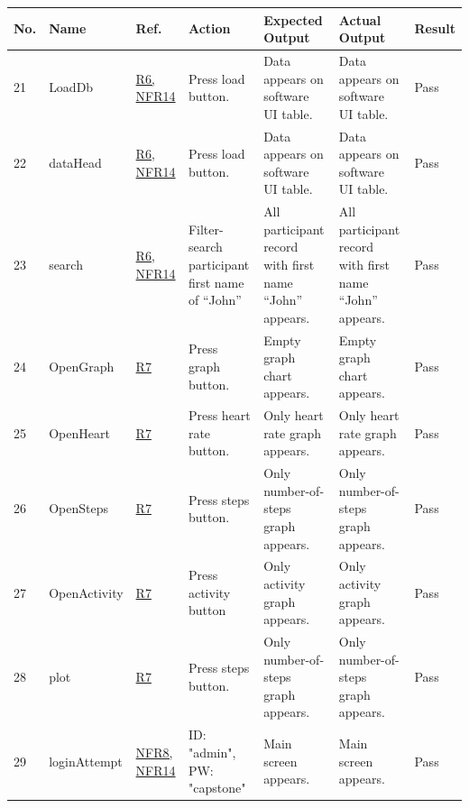 \documentclass[12pt, titlepage]{article}
\begin{document}
\begin{center}
\begin{table} [H]
\begin{tabular}{ | p{0.5cm} | p{2.8cm} |  p{1.1cm} | p{2.7cm} | p{2.7cm} | p{2.7cm} | p{1.1cm} |}
\hline
\textbf{No.} & \textbf{Name}  & \textbf{Ref.} & \textbf{Action} & \textbf{Expected Output} & \textbf{Actual Output} & \textbf{Result} \\
\hline
21 & LoadDb & \href{https://github.com/zakerl/Capstone_Project/blob/main/docs/SRS/SRS.pdf}{R6, NFR14} & Press load button. & Data appears on software UI table. &  Data appears on software UI table. & Pass \\ 
\hline
22 & dataHead & \href{https://github.com/zakerl/Capstone_Project/blob/main/docs/SRS/SRS.pdf}{R6, NFR14} & Press load button. & Data appears on software UI table. & Data appears on software UI table. & Pass \\ 
\hline
23 & search & \href{https://github.com/zakerl/Capstone_Project/blob/main/docs/SRS/SRS.pdf}{R6, NFR14} & Filter-search participant first name of “John” & All participant record with first name “John” appears. & All participant record with first name “John” appears. & Pass \\ 
\hline
24 & OpenGraph & \href{https://github.com/zakerl/Capstone_Project/blob/main/docs/SRS/SRS.pdf}{R7} & Press graph button. & Empty graph chart appears. & Empty graph chart appears. & Pass \\ 
\hline
25 & OpenHeart & \href{https://github.com/zakerl/Capstone_Project/blob/main/docs/SRS/SRS.pdf}{R7} & Press heart rate button. & Only heart rate graph appears. & Only heart rate graph appears. & Pass \\ 
\hline
26 & OpenSteps & \href{https://github.com/zakerl/Capstone_Project/blob/main/docs/SRS/SRS.pdf}{R7} & Press steps button. & Only number-of-steps graph appears. & Only number-of-steps graph appears. & Pass \\ 
\hline
27 & OpenActivity & \href{https://github.com/zakerl/Capstone_Project/blob/main/docs/SRS/SRS.pdf}{R7} & Press activity button & Only activity graph appears. & Only activity graph appears. & Pass \\ 
\hline
28 & plot & \href{https://github.com/zakerl/Capstone_Project/blob/main/docs/SRS/SRS.pdf}{R7} & Press steps button. & Only number-of-steps graph appears. & Only number-of-steps graph appears. & Pass \\ 
\hline
29 & loginAttempt & \href{https://github.com/zakerl/Capstone_Project/blob/main/docs/SRS/SRS.pdf}{NFR8, NFR14} & ID: "admin", PW: "capstone" & Main screen appears. & Main screen appears. & Pass \\ 

\end{tabular}
\end{table}
\end{center}
\end{document}
